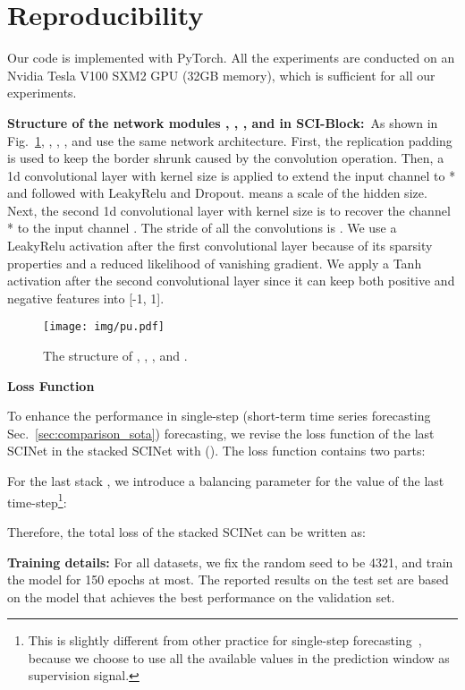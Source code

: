 \documentclass{article}
\begin{document}
\section{Reproducibility}
\label{appendix:reprod}
Our code is implemented with PyTorch. All the experiments are conducted on an Nvidia Tesla V100 SXM2 GPU (32GB memory), which is sufficient for all our experiments. 


\textbf{Structure of the network modules , , , and  in SCI-Block:}~As shown in Fig.~\ref{fig:PU}, , , , and  use the same network architecture.
First, the replication padding is used to keep the border shrunk caused by the convolution operation. Then, a 1d convolutional layer with kernel size  is applied to extend the input channel  to * and followed with LeakyRelu and Dropout.  means a scale of the hidden size. Next, the second 1d convolutional layer with kernel size  is to recover the channel * to the input channel . The stride of all the convolutions is  . We use a LeakyRelu activation after the first convolutional layer because of its sparsity properties and a reduced likelihood of vanishing gradient. We apply a Tanh activation after the second convolutional layer since it can keep both positive and negative features into [-1, 1].

\begin{figure}[h]
\centering
\texttt{[image: img/pu.pdf]}
\caption{The structure of , , , and .}
\label{fig:PU}
\end{figure}

\textbf{Loss Function}

To enhance the performance in single-step (short-term time series forecasting Sec.~\ref{sec:comparison_sota}) forecasting, we revise the loss function of the last SCINet in the stacked SCINet with (). The loss function contains two parts:

For the last stack , we introduce a balancing parameter  for the value of the last time-step\footnote{This is slightly different from other practice for single-step forecasting~\citep{Lai2018ModelingLA}, because we choose to use all the available values in the prediction window as supervision signal.}:


Therefore, the total loss of the stacked SCINet can be written as:


\textbf{Training details:}
For all datasets, we fix the random seed to be 4321, and train the model for 150 epochs at most. The reported results on the test set are based on the model that achieves the best performance on the validation set.
\end{document}

